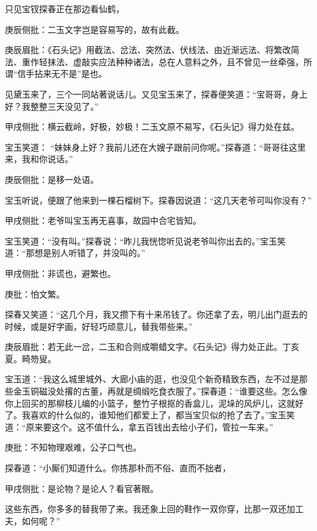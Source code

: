 \begin{parag}
    只见宝钗探春正在那边看仙鹤，\begin{note}庚辰侧批：二玉文字岂是容易写的，故有此截。\end{note}\begin{note}庚辰眉批：《石头记》用截法、岔法、突然法、伏线法、由近渐远法、将繁改简法、重作轻抹法、虚敲实应法种种诸法，总在人意料之外，且不曾见一丝牵强，所谓“信手拈来无不是”是也。\end{note}见黛玉来了，三个一同站著说话儿。又见宝玉来了，探春便笑道：“宝哥哥，身上好？我整整三天没见了。”\begin{note}甲戌侧批：横云截岭，好极，妙极！二玉文原不易写，《石头记》得力处在兹。\end{note}宝玉笑道： “妹妹身上好？我前儿还在大嫂子跟前问你呢。”探春道：“哥哥往这里来，我和你说话。”\begin{note}庚辰侧批：是移一处语。\end{note}宝玉听说，便跟了他来到一棵石榴树下。探春因说道：“这几天老爷可叫你没有？”\begin{note}甲戌侧批：老爷叫宝玉再无喜事，故园中合宅皆知。\end{note}宝玉笑道：“没有叫。”探春说：“昨儿我恍惚听见说老爷叫你出去的。”宝玉笑道：“那想是别人听错了，并没叫的。”\begin{note}甲戌侧批：非谎也，避繁也。\end{note}\begin{note}庚批：怕文繁。\end{note}探春又笑道：“这几个月，我又攒下有十来吊钱了。你还拿了去，明儿出门逛去的时候，或是好字画，好轻巧顽意儿，替我带些来。”\begin{note}庚辰眉批：若无此一岔，二玉和合则成嚼蜡文字。《石头记》得力处正此。丁亥夏。畸笏叟。\end{note}宝玉道：“我这么城里城外、大廊小庙的逛，也没见个新奇精致东西，左不过是那些金玉铜磁没处撂的古董，再就是绸缎吃食衣服了。”探春道：“谁要这些。怎么像你上回买的那柳枝儿编的小篮子，整竹子根抠的香盒儿，泥垛的风炉儿，这就好了。我喜欢的什么似的，谁知他们都爱上了，都当宝贝似的抢了去了。”宝玉笑道：“原来要这个。这不值什么，拿五百钱出去给小子们，管拉一车来。”\begin{note}庚批：不知物理艰难，公子口气也。\end{note}探春道：“小厮们知道什么。你拣那朴而不俗、直而不拙者，\begin{note}甲戌侧批：是论物？是论人？看官著眼。\end{note}这些东西，你多多的替我带了来。我还象上回的鞋作一双你穿，比那一双还加工夫，如何呢？”
\end{parag}


